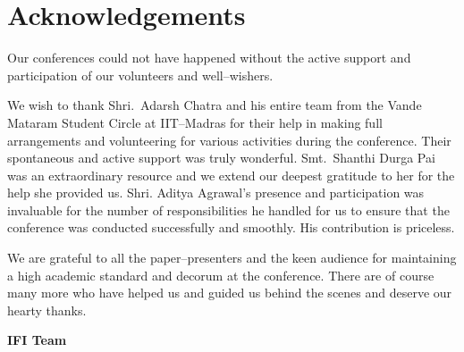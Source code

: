 
\chapter*{Acknowledgements}\label{ack}

Our conferences could not have happened without the active support and participation of our volunteers and well–wishers.

We wish to thank Shri.\ Adarsh Chatra and his entire team from the Vande Mataram Student Circle at IIT–Madras for their help in making full arrangements and volunteering for various activities during the conference. Their spontaneous and active support was truly wonderful. Smt.\ Shanthi Durga Pai was an extraordinary resource and we extend our deepest gratitude to her for the help she provided us. Shri. Aditya Agrawal’s presence and participation was invaluable for the number of responsibilities he handled for us to ensure that the conference was conducted successfully and smoothly. His contribution is priceless.

We are grateful to all the paper–presenters and the keen audience for maintaining a high academic standard and decorum at the conference. There are of course many more who have helped us and guided us behind the scenes and deserve our hearty thanks.

\begin{flushright}
 \textbf{IFI Team}
\end{flushright}

